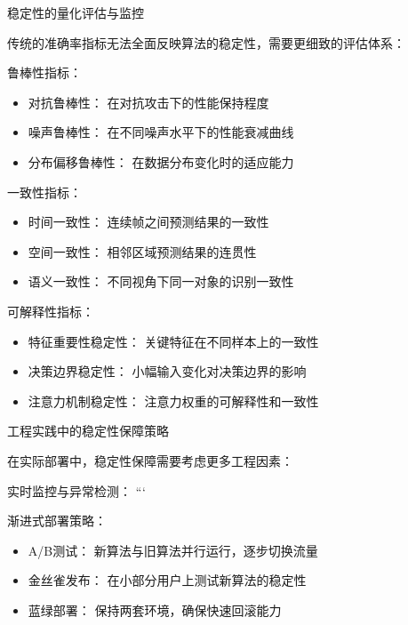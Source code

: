 稳定性的量化评估与监控

传统的准确率指标无法全面反映算法的稳定性，需要更细致的评估体系：

鲁棒性指标：
\begin{itemize}
\item 对抗鲁棒性： 在对抗攻击下的性能保持程度
\item 噪声鲁棒性： 在不同噪声水平下的性能衰减曲线
\item 分布偏移鲁棒性： 在数据分布变化时的适应能力
\end{itemize}

一致性指标：
\begin{itemize}
\item 时间一致性： 连续帧之间预测结果的一致性
\item 空间一致性： 相邻区域预测结果的连贯性
\item 语义一致性： 不同视角下同一对象的识别一致性
\end{itemize}

可解释性指标：
\begin{itemize}
\item 特征重要性稳定性： 关键特征在不同样本上的一致性
\item 决策边界稳定性： 小幅输入变化对决策边界的影响
\item 注意力机制稳定性： 注意力权重的可解释性和一致性
\end{itemize}

工程实践中的稳定性保障策略

在实际部署中，稳定性保障需要考虑更多工程因素：

实时监控与异常检测：
%    
%        
%        
%        
```

渐进式部署策略：
\begin{itemize}
\item A/B测试： 新算法与旧算法并行运行，逐步切换流量
\item 金丝雀发布： 在小部分用户上测试新算法的稳定性
\item 蓝绿部署： 保持两套环境，确保快速回滚能力
\end{itemize}

